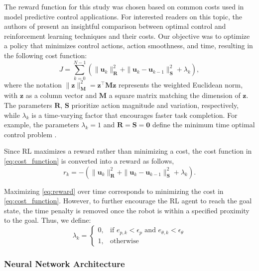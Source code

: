 The reward function for this study was chosen based on common costs used in model predictive control applications. For interested readers on this topic, the authors of \cite{song2023reaching} present an insightful comparison between optimal control and reinforcement learning techniques and their costs. Our objective was to optimize a policy that minimizes control actions, action smoothness, and time, resulting in the following cost function:
\begin{equation}
\label{eq:cost_function}
J = \sum_{k=0}^{N-1}\left(\|\mathbf{u}_k\|_{\mathbf{R}}^2 + \|\mathbf{u}_k-\mathbf{u}_{k-1}\|_{\mathbf{S}}^2 + \lambda_k\right),
\end{equation}
where the notation $\|\mathbf{z}\|^2_\mathbf{M}= \mathbf{z}^\top \mathbf{M} \mathbf{z}$ represents the weighted Euclidean norm, with $\mathbf{z}$ as a column vector and $\mathbf{M}$ a square matrix matching the dimension of $\mathbf{z}$. The parameters $\mathbf{R}$, $\mathbf{S}$ prioritize action magnitude and variation, respectively, while $\lambda_k$ is a time-varying factor that encourages faster task completion. For example, the parameters $\lambda_k = 1$ and $\mathbf{R} = \mathbf{S} = \mathbf{0}$ define the minimum time optimal control problem \cite{rosolia2021minimum}.

Since RL maximizes a reward rather than minimizing a cost, the cost function in \eqref{eq:cost_function} is converted into a reward as follows,
\begin{equation}
\label{eq:reward}
    r_k =  -\left(\|\mathbf{u}_k\|_{\mathbf{R}}^2 + \|\mathbf{u}_k-\mathbf{u}_{k-1}\|_{\mathbf{S}}^2 + \lambda_k\right).
\end{equation}

Maximizing \eqref{eq:reward} over time corresponds to minimizing the cost in \eqref{eq:cost_function}. However, to further encourage the RL agent to reach the goal state, the time penalty is removed once the robot is within a specified proximity to the goal. Thus, we define:
\begin{equation}
\lambda_k = 
\begin{cases} 
      0, & \text{if }  e_{p,k} < \epsilon_p \text{ and } e_{\theta,k} < \epsilon_\theta \\ 
      1, & \text{otherwise} 
   \end{cases}
\end{equation}


\subsubsection{Neural Network Architecture}

